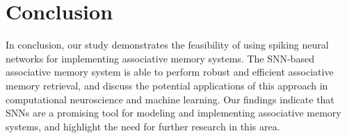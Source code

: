 \chapter{Conclusion}%
In conclusion, our study demonstrates the feasibility of using
spiking neural networks for implementing associative memory systems.
The SNN-based associative memory system is able to perform robust
and efficient associative memory retrieval, and discuss the potential applications
of this approach in computational neuroscience and machine learning.
Our findings indicate that SNNs are a promising tool for modeling and implementing
associative memory systems, and highlight the need for further research in this area.\par
